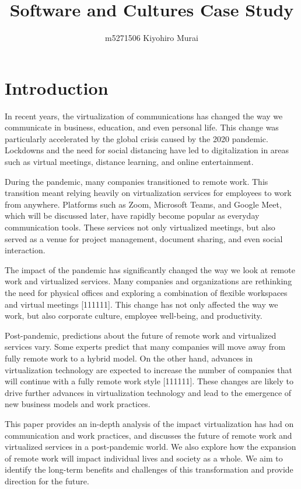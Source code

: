 \documentclass[12pt]{article}
\title{Software and Cultures Case Study}
\author{m5271506 Kiyohiro Murai}
\begin{document}
\maketitle
\tableofcontents
\newpage

\section{Introduction}
In recent years, the virtualization of communications has changed the way we
communicate in business, education, and even personal life. This change was
particularly accelerated by the global crisis caused by the 2020 pandemic.
Lockdowns and the need for social distancing have led to digitalization in
areas such as virtual meetings, distance learning, and online entertainment.

During the pandemic, many companies transitioned to remote work. This
transition meant relying heavily on virtualization services for employees to
work from anywhere. Platforms such as Zoom, Microsoft Teams, and Google Meet,
which will be discussed later, have rapidly become popular as everyday
communication tools. These services not only virtualized meetings, but also
served as a venue for project management, document sharing, and even social
interaction.

The impact of the pandemic has significantly changed the way we look at remote
work and virtualized services. Many companies and organizations are rethinking
the need for physical offices and exploring a combination of flexible
workspaces and virtual meetings [111111]. This change has not only affected the
way we work, but also corporate culture, employee well-being, and productivity.

Post-pandemic, predictions about the future of remote work and virtualized
services vary. Some experts predict that many companies will move away from
fully remote work to a hybrid model. On the other hand, advances in
virtualization technology are expected to increase the number of companies that
will continue with a fully remote work style [111111]. These changes are likely
to drive further advances in virtualization technology and lead to the
emergence of new business models and work practices.

This paper provides an in-depth analysis of the impact virtualization has had
on communication and work practices, and discusses the future of remote work
and virtualized services in a post-pandemic world. We also explore how the
expansion of remote work will impact individual lives and society as a whole.
We aim to identify the long-term benefits and challenges of this transformation
and provide direction for the future.
\end{document}

